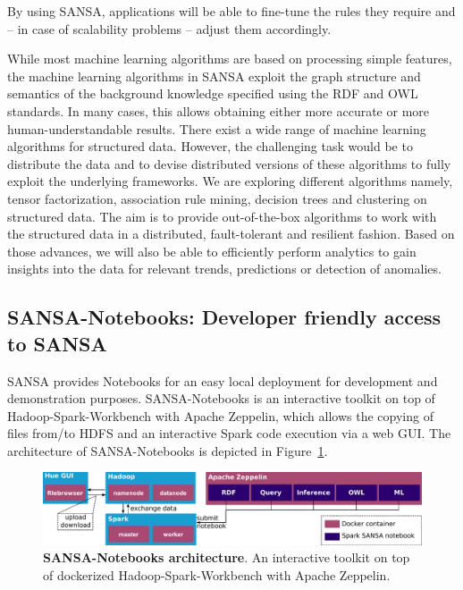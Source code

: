 By using SANSA, applications will be able to fine-tune the rules they require and -- in case of scalability problems -- adjust them accordingly.

While most machine learning algorithms are based on processing simple features, the machine learning algorithms in SANSA exploit the graph structure and semantics of the background knowledge specified using the \gls{RDF} and \gls{OWL} standards. 
In many cases, this allows obtaining either more accurate or more human-understandable results.
There exist a wide range of machine learning algorithms for structured data. 
However, the challenging task would be to distribute the data and to devise distributed versions of these algorithms to fully exploit the underlying frameworks. 
We are exploring different algorithms namely, tensor factorization, association rule mining, decision trees and clustering on structured data. 
The aim is to provide out-of-the-box algorithms to work with the structured data in a distributed, fault-tolerant and resilient fashion.
Based on those advances, we will also be able to efficiently perform analytics to gain insights into the data for relevant trends, predictions or detection of anomalies.

\subsection{SANSA-Notebooks: Developer friendly access to SANSA}
SANSA provides Notebooks for an easy local deployment for development and demonstration purposes.
SANSA-Notebooks is an interactive toolkit on top of Hadoop-Spark-Workbench with Apache Zeppelin, which allows the copying of files from/to \gls{HDFS} and an interactive Spark code execution via a web GUI.
The architecture of SANSA-Notebooks is depicted in Figure~\ref{fig:notebooks_arch}.

\begin{figure}
    \centering
    \includegraphics[width=\textwidth]{images/7_implemenation_and_usecases/SANSA-Notebook-architecture.pdf}
    \caption{\textbf{SANSA-Notebooks architecture}.
    An interactive toolkit on top of dockerized Hadoop-Spark-Workbench with Apache Zeppelin.}
    \label{fig:notebooks_arch}
\end{figure}

